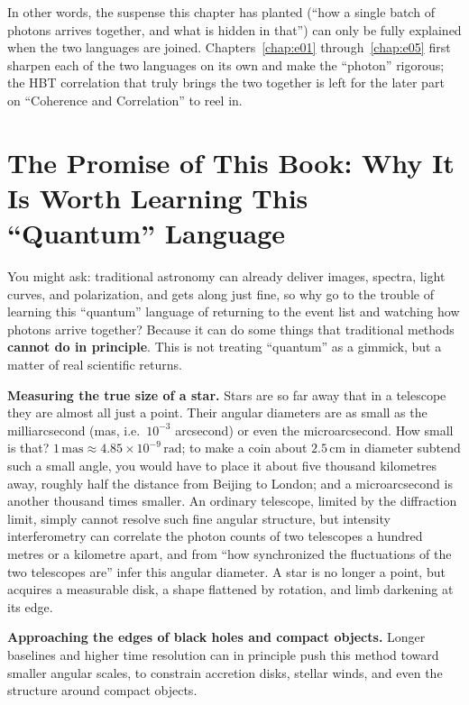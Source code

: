 In other words, the suspense this chapter has planted (``how a single batch of photons arrives together, and what is hidden in that'') can only be fully explained when the two languages are joined. Chapters~\ref{chap:e01} through~\ref{chap:e05} first sharpen each of the two languages on its own and make the ``photon'' rigorous; the HBT correlation that truly brings the two together is left for the later part on ``Coherence and Correlation'' to reel in.

\section{The Promise of This Book: Why It Is Worth Learning This ``Quantum'' Language}
\label{sec:e00-promise}

You might ask: traditional astronomy can already deliver images, spectra, light curves, and polarization, and gets along just fine, so why go to the trouble of learning this ``quantum'' language of returning to the event list and watching how photons arrive together? Because it can do some things that traditional methods \textbf{cannot do in principle}. This is not treating ``quantum'' as a gimmick, but a matter of real scientific returns.

\textbf{Measuring the true size of a star.} Stars are so far away that in a telescope they are almost all just a point. Their angular diameters are as small as the milliarcsecond (mas, i.e.\ \(10^{-3}\) arcsecond) or even the microarcsecond. How small is that? \(1\,\mathrm{mas}\approx4.85\times10^{-9}\,\mathrm{rad}\); to make a coin about \(2.5\,\mathrm{cm}\) in diameter subtend such a small angle, you would have to place it about five thousand kilometres away, roughly half the distance from Beijing to London; and a microarcsecond is another thousand times smaller. An ordinary telescope, limited by the diffraction limit, simply cannot resolve such fine angular structure, but intensity interferometry can correlate the photon counts of two telescopes a hundred metres or a kilometre apart, and from ``how synchronized the fluctuations of the two telescopes are'' infer this angular diameter. A star is no longer a point, but acquires a measurable disk, a shape flattened by rotation, and limb darkening at its edge.

\textbf{Approaching the edges of black holes and compact objects.} Longer baselines and higher time resolution can in principle push this method toward smaller angular scales, to constrain accretion disks, stellar winds, and even the structure around compact objects.

